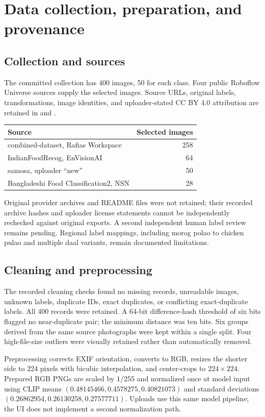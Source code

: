 \documentclass[11pt,a4paper]{article}
\newcommand{\code}[1]{\texttt{\detokenize{#1}}}
\begin{document}
\section{Data collection, preparation, and provenance}
\subsection{Collection and sources}
The committed collection has 400 images, 50 for each class. Four public Roboflow
Universe sources supply the selected images. Source URLs, original labels,
transformations, image identities, and uploader-stated CC BY 4.0 attribution are
retained in \code{data/sources.csv} and \code{data/metadata.csv}.

\begin{center}
\begin{tabularx}{\linewidth}{Xr}
\toprule Source & Selected images\\\midrule
combined-dataset, Rafias Workspace & 258\\
IndianFoodRecog, EnVisionAI & 64\\
samosa, uploader ``new'' & 50\\
Bangladeshi Food Classification2, NSN & 28\\
\bottomrule
\end{tabularx}
\end{center}
Original provider archives and README files were not retained; their recorded
archive hashes and uploader license statements cannot be independently rechecked
against original exports. A second independent human label review remains pending.
Regional label mappings, including morog polao to chicken pulao and multiple daal
variants, remain documented limitations.

\subsection{Cleaning and preprocessing}
The recorded cleaning checks found no missing records, unreadable images, unknown
labels, duplicate IDs, exact duplicates, or conflicting exact-duplicate labels.
All 400 records were retained. A 64-bit difference-hash threshold of six bits
flagged no near-duplicate pair; the minimum distance was ten bits. Six groups
derived from the same source photographs were kept within a single split.
Four high-file-size outliers were visually retained rather than automatically removed.

Preprocessing corrects EXIF orientation, converts to RGB, resizes the shorter side
to 224 pixels with bicubic interpolation, and center-crops to $224\times224$.
Prepared RGB PNGs are scaled by $1/255$ and normalized once at model input using
CLIP means $(0.48145466,0.4578275,0.40821073)$ and standard deviations
$(0.26862954,0.26130258,0.27577711)$. Uploads use this same model pipeline; the
UI does not implement a second normalization path.
\end{document}

